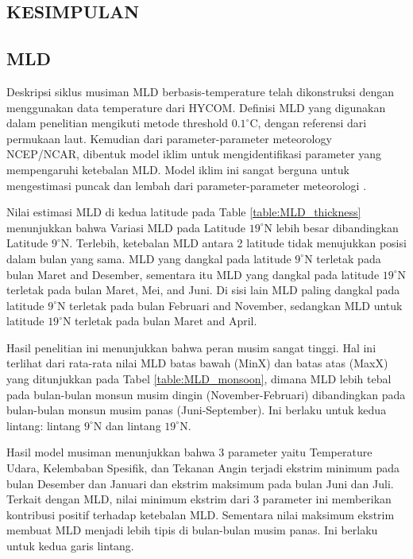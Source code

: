 \vspace{1.5pc}
\begin{spacing}{1.5}
\section[Kesimpulan]{KESIMPULAN}
\subsection[MLD]{MLD}

	Deskripsi siklus musiman MLD berbasis-temperature telah dikonstruksi dengan menggunakan data temperature dari HYCOM. Definisi MLD yang digunakan dalam penelitian mengikuti metode threshold $0.1^\circ$C, dengan referensi dari permukaan laut. Kemudian dari parameter-parameter meteorology NCEP/NCAR, dibentuk model iklim untuk mengidentifikasi parameter yang mempengaruhi ketebalan MLD. Model iklim ini sangat berguna untuk mengestimasi puncak dan lembah dari parameter-parameter meteorologi . 
	
	Nilai estimasi MLD di kedua latitude pada Table \ref{table:MLD_thickness} menunjukkan bahwa Variasi MLD pada Latitude $19^\circ$N lebih besar dibandingkan Latitude $9^\circ$N. Terlebih, ketebalan MLD antara 2 latitude tidak menujukkan posisi dalam bulan yang sama. MLD yang dangkal pada latitude $9^\circ$N terletak pada bulan Maret and Desember, sementara itu MLD yang dangkal pada latitude $19^\circ$N terletak pada bulan Maret, Mei, and Juni. Di sisi lain MLD paling dangkal pada latitude $9^\circ$N terletak pada bulan Februari and November, sedangkan MLD untuk latitude $19^\circ$N terletak pada bulan Maret and April.
	
	Hasil penelitian ini menunjukkan bahwa peran musim sangat tinggi. Hal ini terlihat dari rata-rata nilai MLD batas bawah (MinX) dan batas atas (MaxX) yang ditunjukkan pada Tabel \ref{table:MLD_monsoon}, dimana MLD lebih tebal pada bulan-bulan monsun musim dingin (November-Februari) dibandingkan pada bulan-bulan monsun musim panas (Juni-September). Ini berlaku untuk kedua lintang: lintang $9^\circ$N dan lintang $19^\circ$N.
	
	Hasil model musiman menunjukkan bahwa 3 parameter yaitu Temperature Udara, Kelembaban Spesifik, dan Tekanan Angin terjadi ekstrim minimum pada bulan Desember dan Januari dan ekstrim maksimum pada bulan Juni dan Juli. Terkait dengan MLD, nilai minimum ekstrim dari 3 parameter ini memberikan kontribusi positif terhadap ketebalan MLD. Sementara nilai maksimum ekstrim membuat MLD menjadi lebih tipis di bulan-bulan musim panas. Ini berlaku untuk kedua garis lintang.
	

\end{spacing}
